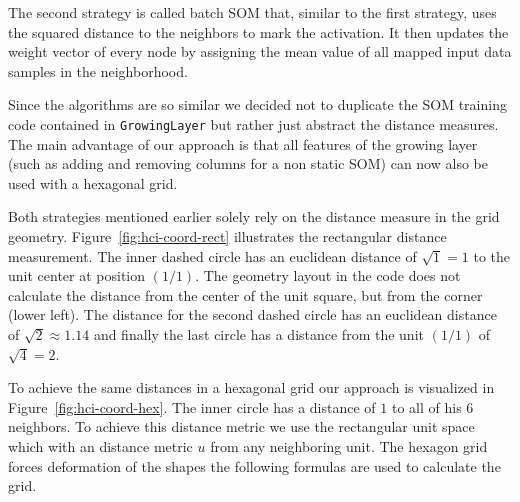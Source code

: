 \documentclass{acm_proc_article-sp}
\begin{document}
The second strategy is called batch SOM that, similar to the first strategy, uses the squared distance to the neighbors
to mark the activation. It then updates the weight vector of every node by assigning the mean value of all mapped input
data samples in the neighborhood.

Since the algorithms are so similar we decided not to duplicate the SOM training code contained in \lstinline!GrowingLayer! but
rather just abstract the distance measures. The main advantage of our approach is that all features of the growing layer (such as adding and removing columns for a non static SOM) can now also be used with a hexagonal grid.

Both strategies mentioned earlier solely rely on the distance measure in the grid geometry.
Figure~\ref{fig:hci-coord-rect} illustrates the rectangular distance measurement.
The inner dashed circle has an euclidean distance of $\sqrt{1} = 1$ to
the unit center at position $(1/1)$. The geometry layout in the code does not calculate the distance from the center of
the unit square, but from the corner (lower left). The distance for the second dashed circle has an euclidean distance of $\sqrt{2} \approx 1.14$ and finally the last circle has a distance from the unit $(1/1)$ of $\sqrt{4} = 2$.

To achieve the same distances in a hexagonal grid our approach is visualized in Figure~\ref{fig:hci-coord-hex}.
The inner circle has a distance of $1$ to all of his 6 neighbors. To achieve this distance metric
we use the rectangular unit space which with an distance metric $u$ from any neighboring unit. The hexagon grid forces deformation
of the shapes the following formulas are used to calculate the grid.
\end{document}
